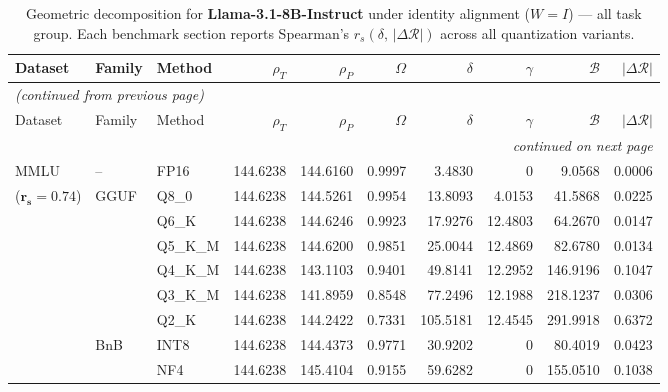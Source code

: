 \begingroup
\small
\setlength{\tabcolsep}{4pt}
\renewcommand{\arraystretch}{1.05}
\setlength{\LTcapwidth}{\textwidth}
\begin{longtable}{ll l rrrrrrr}
\caption{Geometric decomposition for \textbf{Llama-3.1-8B-Instruct} under identity alignment ($W{=}I$) --- all task group. Each benchmark section reports Spearman's $r_s(\delta,\,|\Delta\mathcal{R}|)$ across all quantization variants.}\label{tab:llama_instruct_decomposition_all}\\
\toprule
Dataset & Family & Method & $\rho_T$ & $\rho_P$ & $\Omega$ & $\delta$ & $\gamma$ & $\mathcal{B}$ & $|\Delta\mathcal{R}|$ \\
\midrule
\endfirsthead
\multicolumn{10}{l}{\small\itshape (continued from previous page)}\\
\toprule
Dataset & Family & Method & $\rho_T$ & $\rho_P$ & $\Omega$ & $\delta$ & $\gamma$ & $\mathcal{B}$ & $|\Delta\mathcal{R}|$ \\
\midrule
\endhead
\midrule
\multicolumn{10}{r}{\small\itshape continued on next page}\\
\endfoot
\bottomrule
\endlastfoot
MMLU & -- & FP16 & 144.6238 & 144.6160 & 0.9997 & 3.4830 & \cellcolor{cyan!12} $0$ & 9.0568 & 0.0006 \\
{\small ($\mathbf{r_s{=}0.74}$)} & GGUF & Q8\_0 & 144.6238 & 144.5261 & 0.9954 & 13.8093 & 4.0153 & 41.5868 & 0.0225 \\
 &  & Q6\_K & 144.6238 & 144.6246 & 0.9923 & 17.9276 & 12.4803 & 64.2670 & 0.0147 \\
 &  & Q5\_K\_M & 144.6238 & 144.6200 & 0.9851 & 25.0044 & 12.4869 & 82.6780 & 0.0134 \\
 &  & Q4\_K\_M & 144.6238 & 143.1103 & \cellcolor{red!18} 0.9401 & \cellcolor{red!18} 49.8141 & 12.2952 & \cellcolor{red!18} 146.9196 & \cellcolor{red!18} 0.1047 \\
 &  & Q3\_K\_M & 144.6238 & 141.8959 & \cellcolor{red!18} 0.8548 & \cellcolor{red!18} 77.2496 & 12.1988 & \cellcolor{red!18} 218.1237 & \cellcolor{red!18} 0.0306 \\
 &  & Q2\_K & 144.6238 & 144.2422 & \cellcolor{red!35} 0.7331 & \cellcolor{red!35} 105.5181 & 12.4545 & \cellcolor{red!35} 291.9918 & \cellcolor{red!35} 0.6372 \\
 & BnB & INT8 & 144.6238 & 144.4373 & 0.9771 & 30.9202 & \cellcolor{cyan!12} $0$ & 80.4019 & 0.0423 \\
 &  & NF4 & 144.6238 & 145.4104 & \cellcolor{red!18} 0.9155 & \cellcolor{red!18} 59.6282 & \cellcolor{cyan!12} $0$ & \cellcolor{red!18} 155.0510 & \cellcolor{red!18} 0.1038 \\

\end{longtable}
